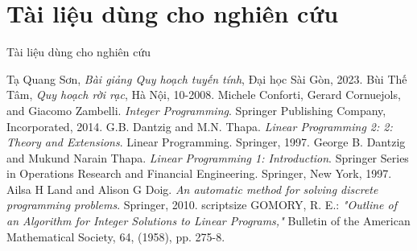 \documentclass{beamer}
\begin{document}
\section{Tài liệu dùng cho nghiên cứu}
\begin{frame}[allowframebreaks]{Tài liệu dùng cho nghiên cứu}
    \scriptsize
    \begin{thebibliography}{}
         Tạ Quang Sơn, \textit{Bài giảng Quy hoạch tuyến tính}, Đại học Sài Gòn, 2023.
         Bùi Thế Tâm, \textit{Quy hoạch rời rạc}, Hà Nội, 10-2008.
         Michele Conforti, Gerard Cornuejols, and Giacomo Zambelli. \textit{Integer Programming}. Springer Publishing Company, Incorporated, 2014.
         G.B. Dantzig and M.N. Thapa. \textit{Linear Programming 2: 2: Theory and Extensions}. Linear Programming. Springer, 1997.
         George B. Dantzig and Mukund Narain Thapa. \textit{Linear Programming 1: Introduction}. Springer Series in Operations Research and Financial Engineering. Springer, New York, 1997.
         Ailsa H Land and Alison G Doig. \textit{An automatic method for solving discrete programming problems}. Springer, 2010.
        scriptsize
         GOMORY, R. E.: \textit{"Outline of an Algorithm for Integer Solutions to Linear Programs,"} Bulletin of the American Mathematical Society, 64, (1958), pp. 275-8.
    \end{thebibliography}
\end{frame}
\end{document}

